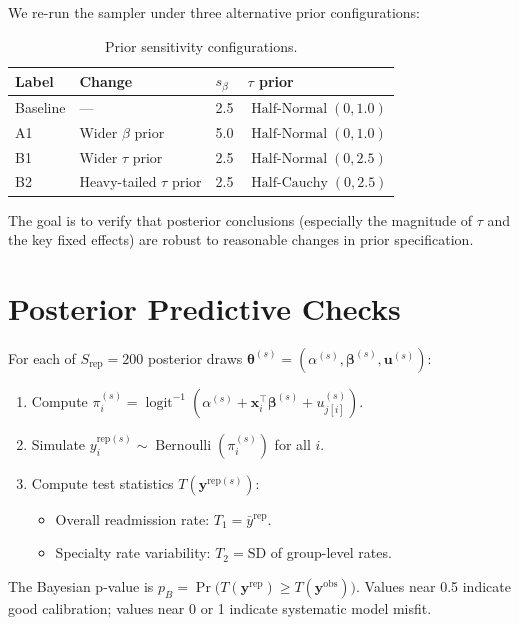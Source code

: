 \documentclass[11pt]{article}
\newcommand{\bx}{\bm{x}}
\newcommand{\by}{\bm{y}}
\newcommand{\bbeta}{\bm{\beta}}
\newcommand{\bu}{\bm{u}}
\newcommand{\btheta}{\bm{\theta}}
\DeclareMathOperator{\logit}{logit}
\DeclareMathOperator{\Bernoulli}{Bernoulli}
\DeclareMathOperator{\HalfNormal}{Half\text{-}Normal}
\DeclareMathOperator{\HalfCauchy}{Half\text{-}Cauchy}
\begin{document}
We re-run the sampler under three alternative prior configurations:

\begin{table}[h]
\centering
\begin{tabular}{llll}
\toprule
Label & Change & $s_\beta$ & $\tau$ prior \\
\midrule
Baseline & --- & 2.5 & $\HalfNormal(0, 1.0)$ \\
A1 & Wider $\beta$ prior & 5.0 & $\HalfNormal(0, 1.0)$ \\
B1 & Wider $\tau$ prior & 2.5 & $\HalfNormal(0, 2.5)$ \\
B2 & Heavy-tailed $\tau$ prior & 2.5 & $\HalfCauchy(0, 2.5)$ \\
\bottomrule
\end{tabular}
\caption{Prior sensitivity configurations.}
\end{table}

The goal is to verify that posterior conclusions (especially the
magnitude of $\tau$ and the key fixed effects) are robust to
reasonable changes in prior specification.

\section{Posterior Predictive Checks}
\label{sec:ppc}

For each of $S_{\text{rep}} = 200$ posterior draws
$\btheta^{(s)} = (\alpha^{(s)}, \bbeta^{(s)}, \bu^{(s)})$:
\begin{enumerate}
  \item Compute $\pi_i^{(s)} = \logit^{-1}(\alpha^{(s)} + \bx_i^\top\bbeta^{(s)} + u_{j[i]}^{(s)})$.
  \item Simulate $y_i^{\text{rep}(s)} \sim \Bernoulli(\pi_i^{(s)})$ for all $i$.
  \item Compute test statistics $T(\by^{\text{rep}(s)})$:
    \begin{itemize}
      \item Overall readmission rate: $T_1 = \bar{y}^{\text{rep}}$.
      \item Specialty rate variability: $T_2 = \text{SD}$ of group-level rates.
    \end{itemize}
\end{enumerate}
The Bayesian p-value is $p_B = \Pr\bigl(T(\by^{\text{rep}}) \ge T(\by^{\text{obs}})\bigr)$.
Values near 0.5 indicate good calibration; values near 0 or 1 indicate
systematic model misfit.
\end{document}
